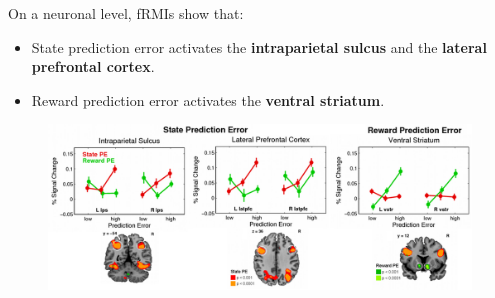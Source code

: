 \begin{casestudy}
    On a neuronal level, fRMIs show that:
    \begin{itemize}
        \item State prediction error activates the \textbf{intraparietal sulcus} and the \textbf{lateral prefrontal cortex}.
        \item Reward prediction error activates the \textbf{ventral striatum}.
    \end{itemize}
    \begin{figure}[H]
        \centering
        \includegraphics[width=0.75\linewidth]{./img/human_latent_experiment4.png}
    \end{figure}
\end{casestudy}

